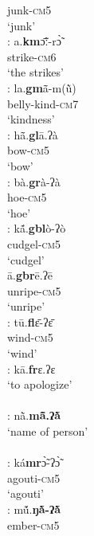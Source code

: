 \documentclass[output=paper]{langscibook}
\begin{document}
\begin{exe}
\begin{multicols}{2}
\begin{xlisti}
            {}  junk-\textsc{cm5}\\
            {}  `junk'\\
        \ex \glll [km]: a.\textbf{km}ɔ̃̄ː-rɔ̃̀\\
            {}  strike-\textsc{cm6} \\
            {}  {`the strikes'}\\
        \ex \glll [gm]:    la.\textbf{gm}ã̄-m(ũ̀)  \\
            {} belly-kind-\textsc{cm}7\\
            {}   `kindness'\\
        \ex \glll [gl]:   hã̄.\textbf{gl}ā.ʔà \\
            {} bow-\textsc{cm}5 \\
            {} `bow'\\
        \ex \glll [gr]:    bà.\textbf{gr}à-ʔà\\
            {}  hoe-\textsc{cm5} \\
            {}  `hoe'\\
        \ex \glll [gbl]:  kã́.\textbf{gbl}ò-ʔò\\
            {} cudgel-\textsc{cm}5 \\
            {} ‘cudgel’\\
        \ex \glll [gbr]    ā.\textbf{gbr}ē.ʔē\\
            {}   unripe-\textsc{cm5}\\
            {}  `unripe'\\
        \ex \glll [fl]:    tū.\textbf{fl}ɛ̄-ʔɛ̄ \\
            {}  wind-\textsc{cm}5\\
            {}  `wind'\\
        \ex \glll [fr]:      kā.\textbf{fr}ɛ.ʔɛ\\
            {}  {`to apologize'}\\
            {}  {}\\
        \ex \glll [ml]:  nã̀.\textbf{mã̄.ʔã̀ ~}\\
            {} {`name of person'}\\
            {} {}\\
        \ex \glll [mr]:     ká\textbf{mr}ɔ̃̀-ʔɔ̃̀ \\
            {}   agouti-\textsc{cm}5\\
            {}   `agouti'\\
        \ex \glll [ŋl]:    mṹ.\textbf{ŋã̀-ʔã̀ }\\
            {}  ember-\textsc{cm}5\\

\end{xlisti}
\end{multicols}
\end{exe}
\end{document}
